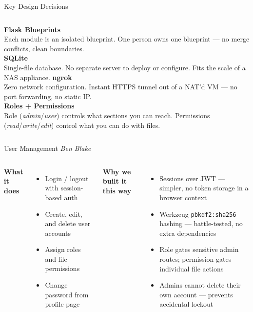 \documentclass[aspectratio=169]{beamer}
\begin{document}
\begin{frame}{Key Design Decisions}
  \begin{columns}[T, onlytextwidth]
      \textbf{Flask Blueprints} \\
      Each module is an isolated blueprint. One person owns one blueprint --- no merge conflicts, clean boundaries. \\[1em]
      \textbf{SQLite} \\
      Single-file database. No separate server to deploy or configure. Fits the scale of a NAS appliance.
      \textbf{ngrok} \\
      Zero network configuration. Instant HTTPS tunnel out of a NAT'd VM --- no port forwarding, no static IP. \\[1em]
      \textbf{Roles + Permissions} \\
      Role (\textit{admin}/\textit{user}) controls what sections you can reach. Permissions (\textit{read}/\textit{write}/\textit{edit}) control what you can do with files.
  \end{columns}
\end{frame}

\begin{frame}{User Management}
  \textit{Ben Blake}
  \vspace{0.5em}
  \begin{columns}[T, onlytextwidth]
      \textbf{What it does}
      \begin{itemize}
        \item Login / logout with session-based auth
        \item Create, edit, and delete user accounts
        \item Assign roles and file permissions
        \item Change password from profile page
      \end{itemize}
      \textbf{Why we built it this way}
      \begin{itemize}
        \item Sessions over JWT --- simpler, no token storage in a browser context
        \item Werkzeug \texttt{pbkdf2:sha256} hashing --- battle-tested, no extra dependencies
        \item Role gates sensitive admin routes; permission gates individual file actions
        \item Admins cannot delete their own account --- prevents accidental lockout
      \end{itemize}
  \end{columns}
\end{frame}
\end{document}
